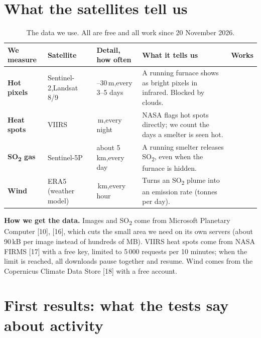 \documentclass[10pt,a4paper]{article}
\newcommand{\SOtwo}{SO\textsubscript{2}}
\newcommand{\ok}{\textcolor{done}{\ding{51}}}
\begin{document}
\section{What the satellites tell us}

\begin{table}[H]
\centering\small
\begin{tabularx}{\textwidth}{@{}>{\raggedright\arraybackslash}p{2.0cm} >{\raggedright\arraybackslash}p{2.5cm} >{\raggedright\arraybackslash}p{2.6cm} X >{\centering\arraybackslash}p{1.3cm}@{}}
\toprule
\textbf{We measure} & \textbf{Satellite} & \textbf{Detail, how often} & \textbf{What it tells us} & \textbf{Works}\\
\midrule
\textbf{Hot pixels} & Sentinel-2,\newline Landsat 8/9 & 20--30\,m,\newline every 3--5 days & A running furnace shows as bright pixels in infrared. Blocked by clouds. & \ok\\
\textbf{Heat spots} & VIIRS & 375\,m,\newline every night & NASA flags hot spots directly; we count the days a smelter is seen hot. & \ok\\
\textbf{\SOtwo{} gas} & Sentinel-5P & about 5\,km,\newline every day & A running smelter releases \SOtwo, even when the furnace is hidden. & \ok\\
\textbf{Wind} & ERA5 (weather model) & 25\,km,\newline every hour & Turns an \SOtwo{} plume into an emission rate (tonnes per day). & \ok\\
\bottomrule
\end{tabularx}
\caption{The data we use. All are free and all work since 20 November 2026.}
\end{table}

\textbf{How we get the data.} Images and \SOtwo{} come from Microsoft Planetary Computer [10], [16], which cuts the small area we need on its own servers (about 90\,kB per image instead of hundreds of MB). VIIRS heat spots come from NASA FIRMS [17] with a free key, limited to 5\,000 requests per 10 minutes; when the limit is reached, all downloads pause together and resume. Wind comes from the Copernicus Climate Data Store [18] with a free account.

\section{First results: what the tests say about activity}\label{sec:results}
\end{document}
